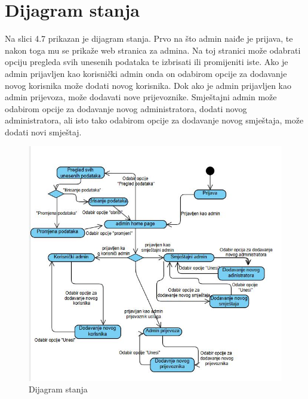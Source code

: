 			
			\eject
		
		\section{Dijagram stanja}
			
			{Na slici 4.7 prikazan je dijagram stanja. Prvo na što admin naiđe je prijava, te nakon toga mu se prikaže web stranica za admina. Na toj stranici može odabrati opciju pregleda svih unesenih podataka te izbrisati ili promijeniti iste. Ako je admin prijavljen kao korisnički admin onda on odabirom opcije za 
			dodavanje novog korisnika može dodati novog korisnika. Dok ako je admin prijavljen kao admin prijevoza, može dodavati nove prijevoznike. Smještajni admin može odabirom opcije za dodavanje novog administratora, dodati novog administratora, ali isto tako odabirom opcije za dodavanje novog smještaja, može dodati novi smještaj.  }
			
			\begin{figure}[H]
				\includegraphics[width=\linewidth]{slike/Dijagram stanja.JPG}
				\centering
				\caption{Dijagram stanja}
				\label{fig:Dijagram stanja}
			\end{figure}

			
			
